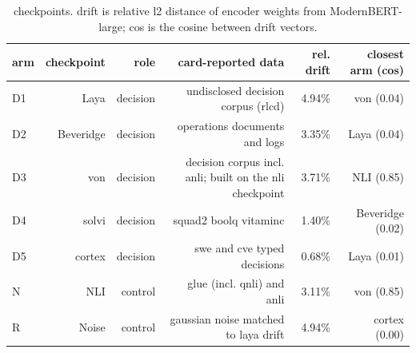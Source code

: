 \begin{table}[t]
\centering
\caption{checkpoints. drift is relative l2 distance of encoder weights from ModernBERT-large; cos is the cosine between drift vectors.}
\begin{tabular}{l r r r r r}
\toprule
arm & checkpoint & role & card-reported data & rel. drift & closest arm (cos) \\
\midrule
D1 & Laya & decision & undisclosed decision corpus (rlcd) & 4.94\% & von (0.04) \\
D2 & Beveridge & decision & operations documents and logs & 3.35\% & Laya (0.04) \\
D3 & von & decision & decision corpus incl. anli; built on the nli checkpoint & 3.71\% & NLI (0.85) \\
D4 & solvi & decision & squad2 boolq vitaminc & 1.40\% & Beveridge (0.02) \\
D5 & cortex & decision & swe and cve typed decisions & 0.68\% & Laya (0.01) \\
N & NLI & control & glue (incl. qnli) and anli & 3.11\% & von (0.85) \\
R & Noise & control & gaussian noise matched to laya drift & 4.94\% & cortex (0.00) \\
\bottomrule
\end{tabular}
\end{table}
